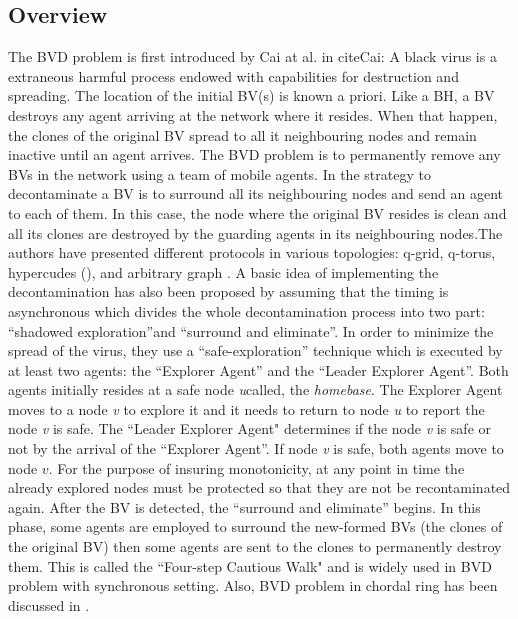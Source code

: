 \subsection{Overview}
The BVD problem is first introduced by Cai at al. in cite{Cai}: A black virus is a  extraneous harmful process endowed with capabilities for destruction and spreading. The location of the initial BV(s) is known a priori. Like a BH, a BV destroys any agent arriving at the network where it resides. When that happen, the clones of the original BV spread to all it neighbouring nodes and remain inactive until an agent arrives. The BVD problem is to permanently remove any BVs in the network using a team of mobile agents. In \cite{Cai}  the strategy to decontaminate a BV is to surround all its neighbouring nodes and send an agent to each of them. In this case, the node where the original BV resides is clean and all its clones are destroyed by the guarding agents in its neighbouring nodes.The authors have presented different protocols in various topologies: q-grid, q-torus, hypercudes  (\cite{Cai}), and arbitrary graph \cite{Cai1}. A basic idea of implementing the decontamination has also been proposed  by   assuming that the timing is asynchronous which divides the whole decontamination process into two part: ``shadowed exploration''and ``surround and eliminate''. In order to minimize the spread of the virus, they use a ``safe-exploration'' technique which is executed by at least two agents: the ``Explorer Agent'' and the ``Leader Explorer Agent''. Both agents  initially resides at a safe node {\em u}called, the {\em homebase}. The Explorer Agent moves to a node {\em v} to explore it and it needs to return to node {\em u} to report the node {\em v} is safe. The ``Leader Explorer Agent" determines if the node {\em v} is safe or not by the arrival of the ``Explorer Agent''. If node {\em v} is safe, both agents move to node $v$. For the purpose of insuring monotonicity, at any point in time the already explored nodes must be protected so that they are not be recontaminated again. After the BV is detected, the ``surround and eliminate'' begins. In this phase, some agents are employed to surround the new-formed BVs (the clones of the original BV) then some agents are sent to the clones to permanently destroy them. This is called the ``Four-step Cautious Walk" and is widely used in BVD problem with synchronous setting. Also, BVD problem in chordal ring has been discussed in
\cite{Alotaibi}.


